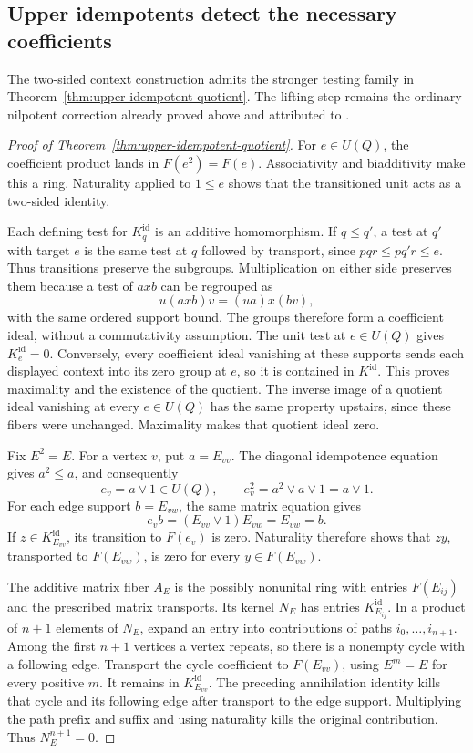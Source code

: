 \subsection{Upper idempotents detect the necessary coefficients}
The two-sided context construction admits the stronger testing family
in Theorem~\ref{thm:upper-idempotent-quotient}. The lifting step remains
the ordinary nilpotent correction already proved above and attributed
to \cite[Lemma~10.32.7, Tag~05BU]{Stacks}.

\begin{proof}[Proof of Theorem~\ref{thm:upper-idempotent-quotient}]
For $e\in U(Q)$, the coefficient product lands in $F(e^2)=F(e)$.
Associativity and biadditivity make this a ring. Naturality applied to
$1\leq e$ shows that the transitioned unit acts as a two-sided
identity.

Each defining test for $K^{\mathrm{id}}_q$ is an additive homomorphism.
If $q\leq q'$, a test at $q'$ with target $e$ is the same test at $q$
followed by transport, since $pqr\leq pq'r\leq e$. Thus transitions
preserve the subgroups. Multiplication on either side preserves them
because a test of $axb$ can be regrouped as
\[
 u(axb)v=(ua)x(bv),
\]
with the same ordered support bound. The groups therefore form a
coefficient ideal, without a commutativity assumption. The unit test
at $e\in U(Q)$ gives $K^{\mathrm{id}}_e=0$. Conversely, every
coefficient ideal vanishing at these supports sends each displayed
context into its zero group at $e$, so it is contained in
$K^{\mathrm{id}}$. This proves maximality and the existence of the
quotient. The inverse image of a quotient ideal vanishing at every
$e\in U(Q)$ has the same property upstairs, since these fibers were
unchanged. Maximality makes that quotient ideal zero.

Fix $E^2=E$. For a vertex $v$, put $a=E_{vv}$. The diagonal
idempotence equation gives $a^2\leq a$, and consequently
\[
 e_v=a\vee1\in U(Q),\qquad
 e_v^2=a^2\vee a\vee1=a\vee1.
\]
For each edge support $b=E_{vw}$, the same matrix equation gives
\[
 e_vb=(E_{vv}\vee1)E_{vw}=E_{vw}=b.
\]
If $z\in K^{\mathrm{id}}_{E_{vv}}$, its transition to $F(e_v)$ is
zero. Naturality therefore shows that $zy$, transported to $F(E_{vw})$,
is zero for every $y\in F(E_{vw})$.

The additive matrix fiber $A_E$ is the possibly nonunital ring with
entries $F(E_{ij})$ and the prescribed matrix transports. Its kernel
$N_E$ has entries $K^{\mathrm{id}}_{E_{ij}}$. In a product of $n+1$
elements of $N_E$, expand an entry into contributions of paths
$i_0,\ldots,i_{n+1}$. Among the first $n+1$ vertices a vertex repeats,
so there is a nonempty cycle with a following edge. Transport the
cycle coefficient to $F(E_{vv})$, using $E^m=E$ for every positive
$m$. It remains in $K^{\mathrm{id}}_{E_{vv}}$. The preceding
annihilation identity kills that cycle and its following edge after
transport to the edge support. Multiplying the path prefix and suffix
and using naturality kills the original contribution. Thus
$N_E^{n+1}=0$.


\end{proof}
